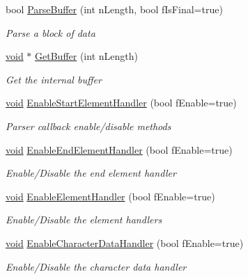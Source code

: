 \begin{DoxyCompactItemize}
bool \hyperlink{class_c_expat_impl_a35df06396bfa8330598572a3f530a5c1}{\-Parse\-Buffer} (int n\-Length, bool f\-Is\-Final=true)
\begin{DoxyCompactList}\small\item\em \-Parse a block of data \end{DoxyCompactList}\item 
\hyperlink{_cpclient_8h_a6464f7480a0fd0ee170cba12b2c0497f}{void} $\ast$ \hyperlink{class_c_expat_impl_ae9b6bb575b4a81c24384a13433113925}{\-Get\-Buffer} (int n\-Length)
\begin{DoxyCompactList}\small\item\em \-Get the internal buffer \end{DoxyCompactList}\item 
\hyperlink{_cpclient_8h_a6464f7480a0fd0ee170cba12b2c0497f}{void} \hyperlink{class_c_expat_impl_a17a24b6c1c157f3c843e730f3f796667}{\-Enable\-Start\-Element\-Handler} (bool f\-Enable=true)
\begin{DoxyCompactList}\small\item\em \-Parser callback enable/disable methods \end{DoxyCompactList}\item 
\hyperlink{_cpclient_8h_a6464f7480a0fd0ee170cba12b2c0497f}{void} \hyperlink{class_c_expat_impl_ac91830d2f654065a22d7331af20a3568}{\-Enable\-End\-Element\-Handler} (bool f\-Enable=true)
\begin{DoxyCompactList}\small\item\em \-Enable/\-Disable the end element handler \end{DoxyCompactList}\item 
\hyperlink{_cpclient_8h_a6464f7480a0fd0ee170cba12b2c0497f}{void} \hyperlink{class_c_expat_impl_acf2e51e7fb9183a180cd8ffdc8bebb3e}{\-Enable\-Element\-Handler} (bool f\-Enable=true)
\begin{DoxyCompactList}\small\item\em \-Enable/\-Disable the element handlers \end{DoxyCompactList}\item 
\hyperlink{_cpclient_8h_a6464f7480a0fd0ee170cba12b2c0497f}{void} \hyperlink{class_c_expat_impl_a9710ebe6b824dd35fc3cffe748df9749}{\-Enable\-Character\-Data\-Handler} (bool f\-Enable=true)
\begin{DoxyCompactList}\small\item\em \-Enable/\-Disable the character data handler \end{DoxyCompactList}\item 

\end{DoxyCompactItemize}
